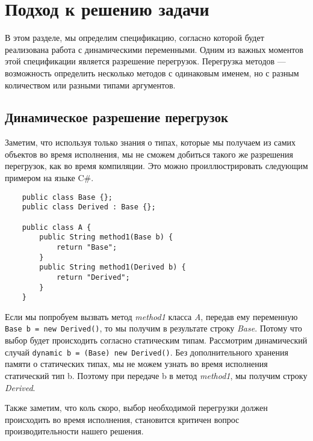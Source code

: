 \section{Подход к решению задачи}



В этом разделе, мы определим спецификацию, согласно которой будет реализована работа с динамическими переменными.  Одним из важных моментов этой спецификации является разрешение перегрузок. Перегрузка методов --- возможность определить несколько методов с одинаковым именем, но с разным количеством или разными типами аргументов.


\subsection{Динамическое разрешение перегрузок}

Заметим, что используя только знания о типах, которые мы получаем из самих объектов во время исполнения, мы не сможем добиться такого же разрешения перегрузок, как во время компиляции. Это можно проиллюстрировать следующим примером на языке C{\#}.

\begin{verbatim}
    public class Base {};
    public class Derived : Base {};
    
    public class A {
        public String method1(Base b) {
            return "Base";
        }
        public String method1(Derived b) {
            return "Derived";
        }
    }
\end{verbatim}

Если мы попробуем вызвать метод \textit{method1} класса \textit{A}, передав ему переменную  \texttt{Base b = new Derived()}, то мы получим в результате строку \textit{Base}. Потому что выбор будет происходить согласно статическим типам. Рассмотрим динамический случай \texttt{dynamic b = (Base) new Derived()}.
Без дополнительного хранения памяти о статических типах, мы не можем узнать во время исполнения статический тип b. Поэтому при передаче b в метод \textit{method1}, мы получим строку \textit{Derived}.

Также заметим, что коль скоро, выбор необходимой перегрузки должен происходить во время исполнения, становится критичен вопрос производительности нашего решения.


